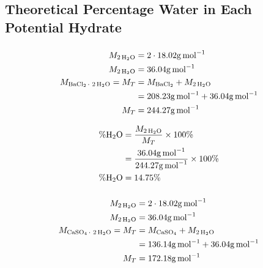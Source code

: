 \documentclass{article}
\begin{document}
\subsection{Theoretical Percentage Water in Each Potential Hydrate}

\subsubsection{}

\begin{align*}
    M_{\ce{2H2O}}              & = 2 \cdot 18.02\si{\gram\per\mol}                    \\
    M_{\ce{2H2O}}              & = 36.04\si{\gram\per\mol}                            \\
    M_{\ce{BaCl2* 2H2O}} = M_T & = M_{\ce{BaCl2}} + M_{\ce{2H2O}}                     \\
                               & = 208.23\si{\gram\per\mol} + 36.04\si{\gram\per\mol} \\
    M_T                        & = 244.27\si{\gram\per\mol}
\end{align*}

\begin{align*}
    \%\ce{H2O} & = \frac{M_{\ce{2H2O}}}{M_T} \times 100\%                                \\
               & = \frac{36.04\si{\gram\per\mol}}{244.27\si{\gram\per\mol}} \times 100\% \\
    \%\ce{H2O} & = 14.75\%
\end{align*}

\subsubsection{}

\begin{align*}
    M_{\ce{2H2O}}              & = 2 \cdot 18.02\si{\gram\per\mol}                    \\
    M_{\ce{2H2O}}              & = 36.04\si{\gram\per\mol}                            \\
    M_{\ce{CaSO4* 2H2O}} = M_T & = M_{\ce{CaSO4}} + M_{\ce{2H2O}}                     \\
                               & = 136.14\si{\gram\per\mol} + 36.04\si{\gram\per\mol} \\
    M_T                        & = 172.18\si{\gram\per\mol}
\end{align*}
\end{document}
